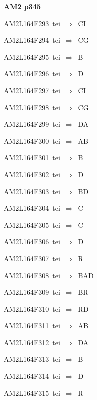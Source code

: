 \par\vfill\eject
{\bf\hfill AM2 p345\hfill\hbox{}}\par\bigskip
{\sixrm AM2L164F293\ {\sixit tei}\ }$\Rightarrow$\ CI\par\smallskip
{\sixrm AM2L164F294\ {\sixit tei}\ }$\Rightarrow$\ CG\par\smallskip
{\sixrm AM2L164F295\ {\sixit tei}\ }$\Rightarrow$\ B\par\smallskip
{\sixrm AM2L164F296\ {\sixit tei}\ }$\Rightarrow$\ D\par\smallskip
{\sixrm AM2L164F297\ {\sixit tei}\ }$\Rightarrow$\ CI\par\smallskip
{\sixrm AM2L164F298\ {\sixit tei}\ }$\Rightarrow$\ CG\par\smallskip
{\sixrm AM2L164F299\ {\sixit tei}\ }$\Rightarrow$\ DA\par\smallskip
{\sixrm AM2L164F300\ {\sixit tei}\ }$\Rightarrow$\ AB\par\smallskip
{\sixrm AM2L164F301\ {\sixit tei}\ }$\Rightarrow$\ B\par\smallskip
{\sixrm AM2L164F302\ {\sixit tei}\ }$\Rightarrow$\ D\par\smallskip
{\sixrm AM2L164F303\ {\sixit tei}\ }$\Rightarrow$\ BD\par\smallskip
{\sixrm AM2L164F304\ {\sixit tei}\ }$\Rightarrow$\ C\par\smallskip
{\sixrm AM2L164F305\ {\sixit tei}\ }$\Rightarrow$\ C\par\smallskip
{\sixrm AM2L164F306\ {\sixit tei}\ }$\Rightarrow$\ D\par\smallskip
{\sixrm AM2L164F307\ {\sixit tei}\ }$\Rightarrow$\ R\par\smallskip
{\sixrm AM2L164F308\ {\sixit tei}\ }$\Rightarrow$\ BAD\par\smallskip
{\sixrm AM2L164F309\ {\sixit tei}\ }$\Rightarrow$\ BR\par\smallskip
{\sixrm AM2L164F310\ {\sixit tei}\ }$\Rightarrow$\ RD\par\smallskip
{\sixrm AM2L164F311\ {\sixit tei}\ }$\Rightarrow$\ AB\par\smallskip
{\sixrm AM2L164F312\ {\sixit tei}\ }$\Rightarrow$\ DA\par\smallskip
{\sixrm AM2L164F313\ {\sixit tei}\ }$\Rightarrow$\ B\par\smallskip
{\sixrm AM2L164F314\ {\sixit tei}\ }$\Rightarrow$\ D\par\smallskip
{\sixrm AM2L164F315\ {\sixit tei}\ }$\Rightarrow$\ R\par\smallskip
